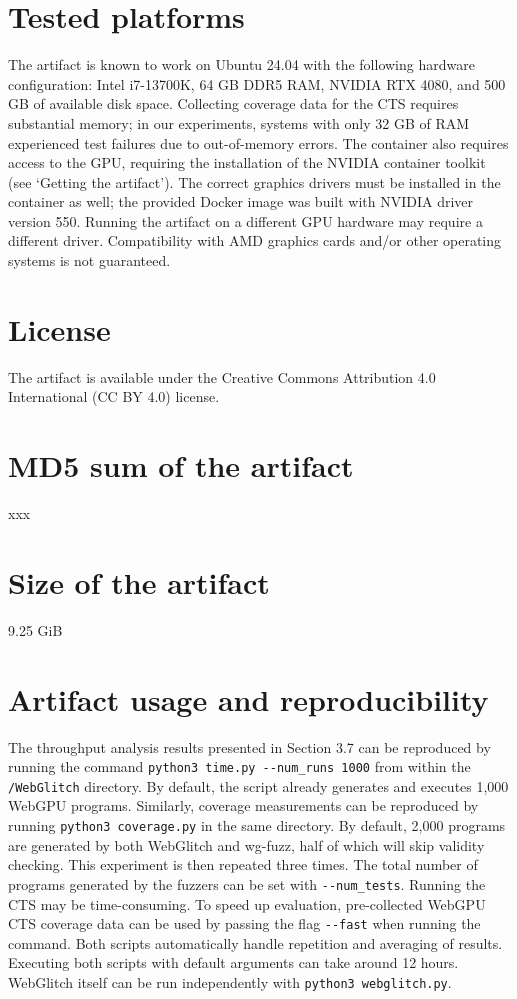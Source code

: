 \documentclass[a4paper,UKenglish]{darts-v2021}
\newenvironment{platforms}{\section{Tested platforms}}{}
\newcommand{\license}[1]{{\section{License}#1}}
\newcommand{\mdsum}[1]{{\section{MD5 sum of the artifact}#1}}
\newcommand{\artifactsize}[1]{{\section{Size of the artifact}#1}}
\begin{document}
\begin{platforms}
The artifact is known to work on Ubuntu 24.04 with the following hardware configuration: Intel i7-13700K, 64 GB DDR5 RAM, NVIDIA RTX 4080, and 500 GB of available disk space. 
Collecting coverage data for the CTS requires substantial memory; in our experiments, systems with only 32 GB of RAM experienced test failures due to out-of-memory errors.
The container also requires access to the GPU, requiring the installation of the NVIDIA container toolkit (see `Getting the artifact').
The correct graphics drivers must be installed in the container as well; the provided Docker image was built with NVIDIA driver version 550. Running the artifact on a different GPU hardware may require a different driver.
Compatibility with AMD graphics cards and/or other operating systems is not guaranteed. 
\end{platforms}

\license{The artifact is available under the Creative Commons Attribution 4.0 International (CC BY 4.0) license.}

\mdsum{xxx}

\artifactsize{9.25 GiB}

\appendix
\section{Artifact usage and reproducibility}
The throughput analysis results presented in Section 3.7 can be reproduced by running the command \texttt{python3 time.py -{}-num\_runs 1000} from within the \texttt{/WebGlitch} directory.
By default, the script already generates and executes 1,000 WebGPU programs.
Similarly, coverage measurements can be reproduced by running \texttt{python3 coverage.py} in the same directory.
By default, 2,000 programs are generated by both WebGlitch and wg-fuzz, half of which will skip validity checking.
This experiment is then repeated three times.
The total number of programs generated by the fuzzers can be set with \texttt{-{}-num\_tests}.
Running the CTS may be time-consuming. To speed up evaluation, pre-collected WebGPU CTS coverage data can be used by passing the flag \texttt{-{}-fast} when running the command.
Both scripts automatically handle repetition and averaging of results.
Executing both scripts with default arguments can take around 12 hours.
WebGlitch itself can be run independently with \texttt{python3 webglitch.py}. 






\end{document}
